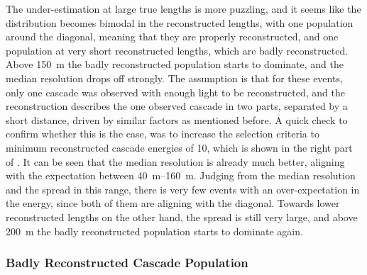 The under-estimation at large true lengths is more puzzling, and it seems like the distribution becomes bimodal in the reconstructed lengths, with one population around the diagonal, meaning that they are properly reconstructed, and one population at very short reconstructed lengths, which are badly reconstructed. Above \SI{150}{\meter} the badly reconstructed population starts to dominate, and the median resolution drops off strongly. The assumption is that for these events, only one cascade was observed with enough light to be reconstructed, and the reconstruction describes the one observed cascade in two parts, separated by a short distance, driven by similar factors as mentioned before. A quick check to confirm whether this is the case, was to increase the selection criteria to minimum reconstructed cascade energies of \SI{10}{\gev}, which is shown in the right part of . It can be seen that the median resolution is already much better, aligning with the expectation between \SIrange[range-phrase=~and~]{40}{160}{\meter}. Judging from the median resolution and the spread in this range, there is very few events with an over-expectation in the energy, since both of them are aligning with the diagonal. Towards lower reconstructed lengths on the other hand, the spread is still very large, and above \SI{200}{\meter} the badly reconstructed population starts to dominate again.


\subsubsection{Badly Reconstructed Cascade Population}

